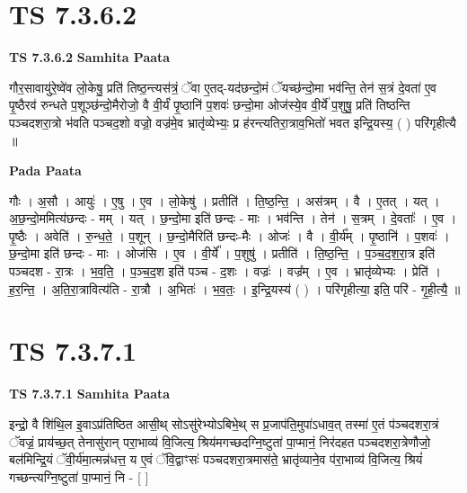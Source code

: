 \documentclass[17pt]{extarticle}
\begin{document}
\section*{ TS 7.3.6.2 }

\textbf{TS 7.3.6.2 } \newline
\textbf{Samhita Paata} \newline

गौर॒सावायु॑रे॒ष्वे॑व लो॒केषु॒ प्रति॑ तिष्ठ॒न्त्यस॑त्रं॒ ॅवा ए॒तद्-यद॑छन्दो॒मं ॅयच्छ॑न्दो॒मा भव॑न्ति॒ तेन॑ स॒त्रं दे॒वता॑ ए॒व पृ॒ष्ठैरव॑ रुन्धते प॒शूञ्छ॑न्दो॒मैरोजो॒ वै वी॒र्यं॑ पृ॒ष्ठानि॑ प॒शवः॑ छन्दो॒मा ओज॑स्ये॒व वी॒र्ये॑ प॒शुषु॒ प्रति॑ तिष्ठन्ति पञ्चदशरा॒त्रो भ॑वति पञ्चद॒शो वज्रो॒ वज्र॑मे॒व भ्रातृ॑व्येभ्यः॒ प्र ह॑रन्त्यतिरा॒त्राव॒भितो॑ भवत इन्द्रि॒यस्य॒ ( ) परि॑गृहीत्यै ॥ \newline

\textbf{Pada Paata} \newline

गौः । अ॒सौ । आयुः॑ । ए॒षु । ए॒व । लो॒केषु॑ । प्रतीति॑ । ति॒ष्ठ॒न्ति॒ । अस॑त्रम् । वै । ए॒तत् । यत् । अ॒छ॒न्दो॒ममित्य॑छन्दः - मम् । यत् । छ॒न्दो॒मा इति॑ छन्दः - माः । भव॑न्ति । तेन॑ । स॒त्रम् । दे॒वताः᳚ । ए॒व । पृ॒ष्ठैः । अवेति॑ । रु॒न्ध॒ते॒ । प॒शून् । छ॒न्दो॒मैरिति॑ छन्दः-मैः । ओजः॑ । वै । वी॒र्य᳚म् । पृ॒ष्ठानि॑ । प॒शवः॑ । छ॒न्दो॒मा इति॑ छन्दः - माः । ओज॑सि । ए॒व । वी॒र्ये᳚ । प॒शुषु॑ । प्रतीति॑ । ति॒ष्ठ॒न्ति॒ । प॒ञ्च॒द॒श॒रा॒त्र इति॑ पञ्चदश - रा॒त्रः । भ॒व॒ति॒ । प॒ञ्च॒द॒श इति॑ पञ्च - द॒शः । वज्रः॑ । वज्र᳚म् । ए॒व । भ्रातृ॑व्येभ्यः । प्रेति॑ । ह॒र॒न्ति॒ । अ॒ति॒रा॒त्रावित्य॑ति - रा॒त्रौ । अ॒भितः॑ । भ॒व॒तः॒ । इ॒न्द्रि॒यस्य॑ ( ) । परि॑गृहीत्या॒ इति॒ परि॑ - गृ॒ही॒त्यै॒ ॥  \newline




\section*{ TS 7.3.7.1 }

\textbf{TS 7.3.7.1 } \newline
\textbf{Samhita Paata} \newline

इन्द्रो॒ वै शि॑थि॒ल इ॒वाऽप्र॑तिष्ठित आसी॒थ् सोऽसु॑रेभ्योऽबिभे॒थ् स प्र॒जाप॑ति॒मुपा॑ऽधाव॒त् तस्मा॑ ए॒तं प॑ञ्चदशरा॒त्रं ॅवज्रं॒ प्राय॑च्छ॒त् तेनासु॑रान् परा॒भाव्य॑ वि॒जित्य॒ श्रिय॑मगच्छदग्नि॒ष्टुता॑ पा॒प्मानं॒ निर॑दहत पञ्चदशरा॒त्रेणौजो॒ बल॑मिन्द्रि॒यं ॅवी॒र्य॑मा॒त्मन्न॑धत्त॒ य ए॒वं ॅवि॒द्वाꣳसः॑ पञ्चदशरा॒त्रमास॑ते॒ भ्रातृ॑व्याने॒व प॑रा॒भाव्य॑ वि॒जित्य॒ श्रियं॑ गच्छन्त्यग्नि॒ष्टुता॑ पा॒प्मानं॒ नि - [  ] \newline
\end{document}
